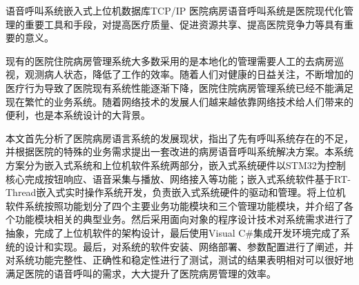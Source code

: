 
\begin{Cabstract}{语音呼叫系统}{嵌入式}{上位机}{数据库}{TCP/IP}
医院病房语音呼叫系统是医院现代化管理的重要工具和手段，对提高医疗质量、促进资源共享、提高医院竞争力等具有重要的意义。

现有的医院住院病房管理系统大多数采用的是本地化的管理需要人工的去病房巡视，观测病人状态，降低了工作的效率。随着人们对健康的日益关注，不断增加的医疗行为导致了医院现有系统性能逐渐下降，医院住院病房管理系统已经不能满足现在繁忙的业务系统。随着网络技术的发展人们越来越依靠网络技术给人们带来的便利，也是本系统设计的大背景。

本文首先分析了医院病房语言系统的发展现状，指出了先有呼叫系统存在的不足，并根据医院的特殊的业务需求提出一套改进的病房语音呼叫系统解决方案。本系统方案分为嵌入式系统和上位机软件系统两部分，嵌入式系统硬件以STM32为控制核心完成按钮响应、语音采集与播放、网络接入等功能；嵌入式系统软件基于RT-Thread嵌入式实时操作系统开发，负责嵌入式系统硬件的驱动和管理。将上位机软件系统按照功能划分了四个主要业务功能模块和三个管理功能模块，并介绍了各个功能模块相关的典型业务。然后采用面向对象的程序设计技术对系统需求进行了抽象，完成了上位机软件的架构设计，最后使用Visual C{\#}集成开发环境完成了系统的设计和实现。最后，对系统的软件安装、网络部署、参数配置进行了阐述，并对系统功能完整性、正确性和稳定性进行了测试，测试的结果表明相对可以很好地满足医院的语音呼叫的需求，大大提升了医院病房管理的效率。
\end{Cabstract}
